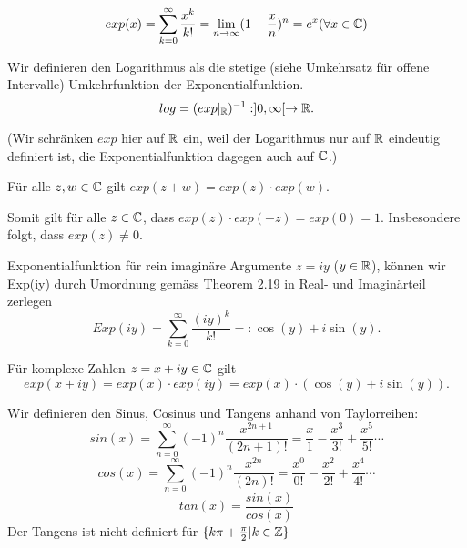 \begin{definition}[Exponentialfunktion]
$$exp(x) = \sum_{k=0}^{\infty} \frac{x^k}{k!} = \lim_{n \rightarrow \infty} (1+\frac{x}{n})^n = e^x (\forall x \in \mathbb{C})$$
\end{definition}

\begin{definition}[Logarithmus]
Wir definieren den Logarithmus als die stetige (siehe Umkehrsatz für offene Intervalle) Umkehrfunktion der Exponentialfunktion. 
$$log=(exp|_{\mathbb{R}})^{-1} : ]0,\infty[\to\mathbb{R}.$$

(Wir schränken $exp$ hier auf $\mathbb{R}$ ein, weil der Logarithmus nur auf $\mathbb{R}$ eindeutig definiert ist, die Exponentialfunktion dagegen auch auf $\mathbb{C}$.)
\end{definition}

\begin{theorem}[Additionstheorem]
	Für alle $z, w \in \mathbb{C}$ gilt $exp(z+w) = exp(z) \cdot exp(w)$.
    
    Somit gilt für alle $z \in \mathbb{C}$, dass $exp(z) \cdot exp(-z) = exp(0) = 1$. Insbesondere folgt, dass $exp(z) \neq 0$.
\end{theorem}

\begin{remark}
Exponentialfunktion für rein imaginäre Argumente $z = iy$ ($y\in \mathbb{R}$), können wir Exp(iy) durch Umordnung gemäss Theorem 2.19 in Real- und Imaginärteil zerlegen
\[
Exp(iy) = \sum_{k=0}^{\infty} \frac{(iy)^k}{k!} =: \cos(y) + i\sin(y).
\]
\end{remark}

\begin{remark}
Für komplexe Zahlen $z=x+iy \in \mathbb{C}$ gilt
\[
exp(x+iy) = exp(x) \cdot exp(iy) = exp(x) \cdot (\cos(y)+i\sin(y)).
\]
\end{remark}

\begin{definition}
Wir definieren den Sinus, Cosinus und Tangens anhand von Taylorreihen:
$$sin(x) = \sum^{\infty}_{n = 0} (-1)^n \frac{x^{2n+1}}{(2n+1)!}= \frac{x}{1} - \frac{x^3}{3!}+\frac{x^5}{5!} \cdots$$
$$cos(x) = \sum^{\infty}_{n = 0} (-1)^n \frac{x^{2n}}{(2n)!}= \frac{x^0}{0!} - \frac{x^2}{2!}+\frac{x^4}{4!} \cdots$$
$$tan(x) = \frac{sin(x)}{cos(x)}$$
Der Tangens ist nicht definiert für $\{k\pi + \frac{\pi}{2} | k \in \mathbb{Z}\}$

\end{definition}